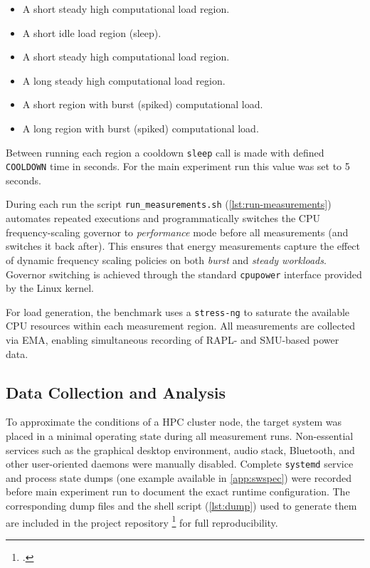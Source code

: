 \begin{itemize}
  \item A short steady high computational load region.
  \item A short idle load region (sleep).
  \item A short steady high computational load region.
  \item A long steady high computational load region.
  \item A short region with burst (spiked) computational load.
  \item A long region with burst (spiked) computational load.
\end{itemize}

Between running each region a cooldown \texttt{sleep} call is made with
defined \texttt{COOLDOWN} time in seconds. For the main experiment run this
value was set to 5 seconds.

During each run the script \lstinline|run_measurements.sh|
(\cref{lst:run-measurements}) automates repeated executions and
programmatically switches the \gls{CPU} frequency-scaling governor to
\emph{performance} mode before all measurements (and switches it back after).
This ensures that energy measurements capture the effect of dynamic frequency
scaling policies on both \emph{burst} and \emph{steady workloads}. Governor
switching is achieved through the standard \texttt{cpupower} interface provided
by the Linux kernel.

For load generation, the benchmark uses a \texttt{stress-ng} \parencite{stress-ng}
to saturate the available CPU resources within each measurement region.
All measurements are collected via \gls{EMA}, enabling simultaneous recording of
\gls{RAPL}- and \gls{SMU}-based power data.

\subsection{Data Collection and Analysis}

To approximate the conditions of a \gls{HPC} cluster node, the target system
was placed in a minimal operating state during all measurement runs.
Non-essential services such as the graphical desktop environment, audio stack,
Bluetooth, and other user-oriented daemons were manually disabled.
Complete \texttt{systemd} service and process state dumps (one example available in
\cref{app:swspec}) were recorded before main experiment run to document the exact
runtime configuration. The corresponding dump files and the shell script
(\cref{lst:dump}) used to generate them are included in the project repository
\footcite{yahdzhyiev2025repo} for full reproducibility.


